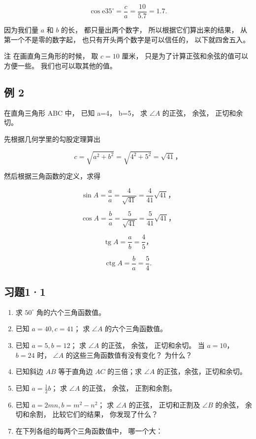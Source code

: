\[
\cos \mathrm{e} 35 ^{\circ} = \frac {c}{a} = \frac {10}{5.7} = 1.7.
\]

因为我们量 \(a\) 和 \(b\) 的长， 都只量出两个数字，
所以根据它们算出来的结果， 从第一个不是零的数字起，
也只有开头两个数字是可以信任的， 以下就四舍五入。

注 在画直角三角形的时候， 取 \(c = 10\) 厘米，
只是为了计算正弦和余弦的值可以方便一些。 我们也可以取其他的值。

\subsection{例 2}

在直角三角形 ABC 中， 已知 a=4， b=5， 求 \(\angle A\) 的正弦， 余弦，
正切和余切。

 先根据几何学里的勾股定理算出

\[
c = \sqrt {a ^ {2} + b ^ {2}} = \sqrt {4 ^ {2} + 5 ^ {2}} = \sqrt {41}\text{，}
\]

然后根据三角函数的定义，求得

\[
\sin A = \frac {a}{a} = \frac {4}{\sqrt {41}} = \frac {4}{41} \sqrt {41}\text{，}
\]

\[
\cos A = \frac {b}{a} = \frac {5}{\sqrt {41}} = \frac {5}{41} \sqrt {41}\text{，}
\]

\[
\operatorname{tg} A = \frac {a}{b} = \frac {4}{5}\text{，}
\]

\[
\operatorname{ctg} A = \frac {b}{a} = \frac {5}{4}.
\]

\subsection{习题1·1}

\begin{enumerate}
\item
  求 \(50^{\circ}\) 角的六个三角函数值。
\item
  已知 \(a = 40, c = 41\)； 求 \(\angle A\) 的六个三角函数值。
\item
  已知 \(a = 5, b = 12\)； 求 \(\angle A\) 的正弦， 余弦， 正切和余切。
  当 \(a = 10\)， \(b = 24\) 时， \(\angle A\)
  的这些三角函数值有没有变化？ 为什么？
\item
  已知斜边 \(AB\) 等于直角边 \(AC\) 的三倍；求 \(\angle A\)
  的正弦，余弦，正切和余切。
\item
  已知 \(a = \frac{1}{2} b\)； 求 \(\angle A\) 的正弦， 余弦，
  正割和余割。
\item
  已知 \(a = 2mn, b = m^2 - n^2\)； 求 \(\angle A\) 的正弦，
  正切和正割及 \(\angle B\) 的余弦， 余切和余割， 比较它们的结果，
  你发现了什么？
\item
  在下列各组的每两个三角函数值中， 哪一个大：
\end{enumerate}

